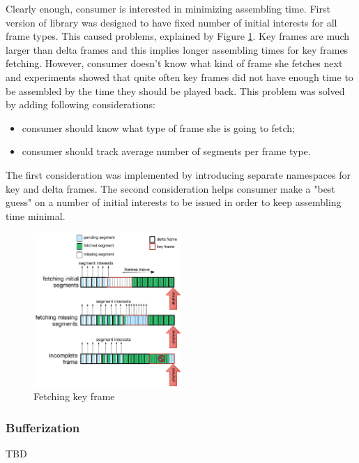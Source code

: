 \documentclass[10pt]{proc}
\begin{document}
Clearly enough, consumer is interested in minimizing assembling time. First version of library was designed to have fixed number of initial interests for all frame types. This caused problems, explained by Figure \ref{fig:fetch-key}. Key frames are much larger than delta frames and this implies longer assembling times for key frames fetching. However, consumer doesn't know what kind of frame she fetches next and experiments showed that quite often key frames did not have enough time to be assembled by the time they should be played back. This problem was solved by adding following considerations:
\begin{itemize}
\item consumer should know what type of frame she is going to fetch;
\item consumer should track average number of segments per frame type.
\end{itemize}

The first consideration was implemented by introducing separate namespaces for key and delta frames. The second consideration helps consumer make a "best guess" on a number of initial interests to be issued in order to keep assembling time minimal.

\begin{figure}[Ht!]
\centering
\includegraphics[width=0.5\textwidth]{key-fetch}
\caption{Fetching key frame}
\label{fig:fetch-key}
\end{figure}


\subsubsection{Bufferization}
TBD

\end{document}
